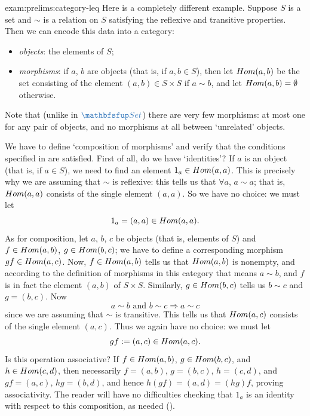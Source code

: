 \begin{exam}{}{exam:prelims:category-leq}
  Here is a completely different example. Suppose $S$ is a set and
  $\sim$ is a relation on $S$ satisfying the reflexive and transitive
  properties. Then we can encode this data into a category:
  \begin{itemize}
  \item \emph{objects}: the elements of $S$;
  \item \emph{morphisms}: if $a$, $b$ are objects (that is, if
    $a, b \in S$), then let $Hom(a, b)$ be the set consisting of the
    element $(a, b) \in S \times S$ if $a \sim b$, and let
    $Hom(a, b) = \emptyset$ otherwise.
  \end{itemize}
  Note that (unlike in $\categ{Set}$) there are very few morphisms: at
  most one for any pair of objects, and no morphisms at all between
  `unrelated' objects.

  We have to define `composition of morphisms' and verify that the
  conditions specified in
   are satisfied. First
  of all, do we have `identities'? If $a$ is an object (that is, if
  $a \in S$), we need to find an element $1_a \in Hom(a, a)$. This is
  precisely why we are assuming that $\sim$ is reflexive: this tells
  us that $\forall a$, $a \sim a$; that is, $Hom(a, a)$ consists of
  the single element $(a, a)$. So we have no choice: we must let
  \[ 1_a = (a, a) \in Hom(a, a). \] As for composition, let $a$, $b$,
  $c$ be objects (that is, elements of $S$) and $f \in Hom(a, b)$,
  $g \in Hom(b, c)$; we have to define a corresponding morphism
  $gf \in Hom(a, c)$.  Now, $f \in Hom(a, b)$ tells us that
  $Hom(a, b)$ is nonempty, and according to the definition of
  morphisms in this category that means $a \sim b$, and $f$ is in fact
  the element $(a, b)$ of $S \times S$.  Similarly, $g \in Hom(b, c)$
  tells us $b \sim c$ and $g = (b, c)$. Now
  \[ a \sim b \text{ and } b \sim c \Rightarrow a \sim c \] since we
  are assuming that $\sim$ is transitive. This tells us that
  $Hom(a, c)$ consists of the single element $(a, c)$. Thus we again
  have no choice: we must let
  \[ gf := (a, c) \in Hom(a, c). \] Is this operation associative? If
  $f \in Hom(a, b)$, $g \in Hom(b, c)$, and $h \in Hom(c, d)$, then
  necessarily $f = (a,b)$, $g = (b,c)$, $h = (c,d)$, and $gf = (a,c)$,
  $hg = (b,d)$, and hence $h(gf) = (a,d) = (hg)f$, proving
  associativity. The reader will have no difficulties checking that
  $1_a$ is an identity with respect to this composition, as needed
  ().


\end{exam}
